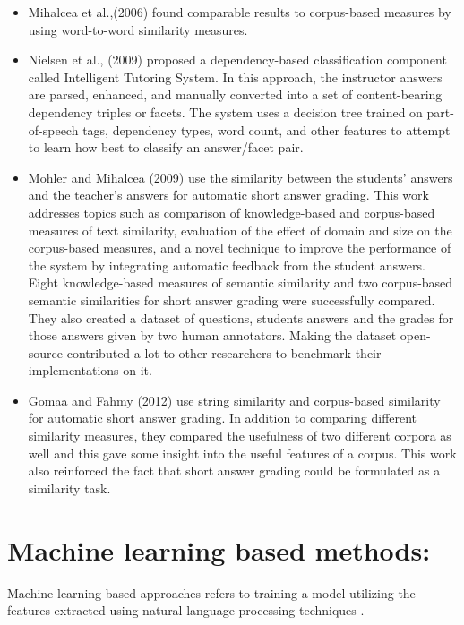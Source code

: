 \begin{itemize}
	\item Mihalcea et al.,(2006) \cite{Mihalcea2006} found comparable results to corpus-based measures by using word-to-word similarity measures.
	\item Nielsen et al., (2009) \cite{Nielsen2009}proposed a dependency-based classification component called Intelligent Tutoring System. In this approach, the instructor answers are parsed, enhanced, and manually converted into a set of content-bearing dependency triples or facets. The system uses a decision tree trained on part-of-speech tags, dependency types, word count, and other features to attempt to learn how best to classify an answer/facet pair.
	\item Mohler and Mihalcea (2009) \cite{Mohler2009} use the similarity between the students’ answers and the teacher’s answers for automatic short answer grading. This work addresses topics such as comparison of knowledge-based and corpus-based measures of text similarity, evaluation of the effect of domain and size on the corpus-based measures, and a novel technique to improve the performance of the system by integrating automatic feedback from the student answers. Eight knowledge-based measures of semantic similarity and two corpus-based semantic similarities for short answer grading were successfully compared. They also created a dataset of questions, students answers and the grades for those answers given by two human annotators. Making the dataset open-source contributed a lot to other researchers to benchmark their implementations on it.
	\item Gomaa and Fahmy (2012) \cite{Gomaa2012} use string similarity and corpus-based similarity for automatic short answer grading. In addition to comparing different similarity measures, they compared the usefulness of two different corpora as well and this gave some insight into the useful features of a corpus. This work also reinforced the fact that short answer grading could be formulated as a similarity task.
	
\end{itemize}

\section{Machine learning based methods:}

Machine learning based approaches refers to training a model utilizing the features extracted using  natural language processing techniques \cite{Burrows2015}.

